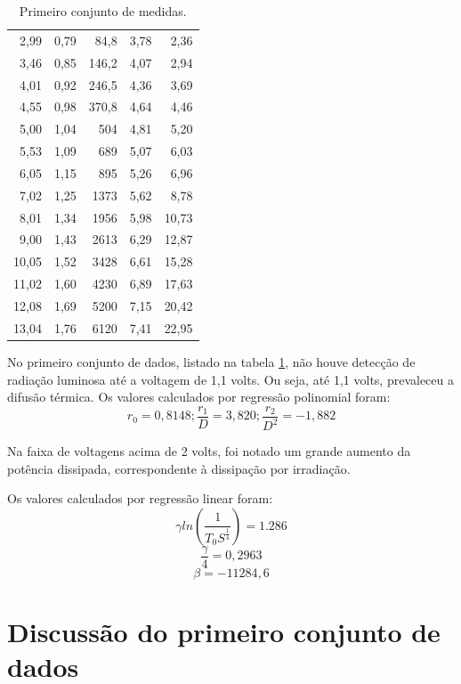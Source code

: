 \documentclass[brazilian,12pt,a4paper,final]{article}
\begin{document}
\begin{table}[htbp]
\begin{tabular}{|r|r|r|r|r|}
2,99    &       0,79    &       84,8    &       3,78    &       2,36    \\
3,46    &       0,85    &       146,2   &       4,07    &       2,94    \\
4,01    &       0,92    &       246,5   &       4,36    &       3,69    \\
4,55    &       0,98    &       370,8   &       4,64    &       4,46    \\
5,00    &       1,04    &       504     &       4,81    &       5,20    \\
5,53    &       1,09    &       689     &       5,07    &       6,03    \\
6,05    &       1,15    &       895     &       5,26    &       6,96    \\
7,02    &       1,25    &       1373    &       5,62    &       8,78    \\
8,01    &       1,34    &       1956    &       5,98    &       10,73   \\
9,00    &       1,43    &       2613    &       6,29    &       12,87   \\
10,05   &       1,52    &       3428    &       6,61    &       15,28   \\
11,02   &       1,60    &       4230    &       6,89    &       17,63   \\
12,08   &       1,69    &       5200    &       7,15    &       20,42   \\
13,04   &       1,76    &       6120    &       7,41    &       22,95   \\
 \hline
 \end{tabular}
 \caption{Primeiro conjunto de medidas.}
 \label{tabdados1}
\end{table}

No primeiro conjunto de dados, listado na tabela \ref{tabdados1}, 
não houve detecção de radiação luminosa até a voltagem de 1,1 volts.
Ou seja, até 1,1 volts, prevaleceu a difusão térmica.
Os valores calculados por regressão polinomial foram:
$$r_0=0,8148; \frac{r_1}{D}=3,820; \frac{r_2}{D^2}=-1,882$$

Na faixa de voltagens acima de 2 volts, foi notado um grande aumento da
potência dissipada, correspondente à dissipação por irradiação.

Os valores calculados por regressão linear foram:
$$\gamma ln(\frac{1}{T_0S^\frac{1}{4}}) = 1.286$$
$$\frac{\gamma}{4}=0,2963$$
$$\beta = -11284,6$$

\section{Discussão do primeiro conjunto de dados}
\end{document}
